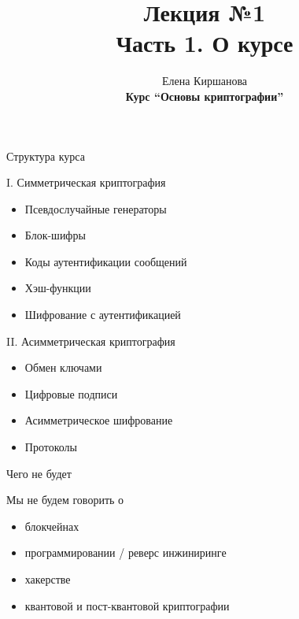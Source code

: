 \documentclass[usenames,dvipsnames,8pt,aspectratio=169]{beamer}
\title{Лекция №1 \\[10pt]
		Часть 1. О курсе}
\date{ Елена Киршанова \\  \textbf{Курс ``Основы криптографии''} \\  }
\begin{document}
	
\begin{frame}
	\titlepage
\end{frame}

\begin{frame}{Структура курса}

\Large
{\color{Orange} I. Симметрическая криптография} \\[10pt]
\begin{itemize}
	\item Псевдослучайные генераторы
	\item Блок-шифры
	\item Коды аутентификации сообщений 
	\item Хэш-функции
	\item Шифрование  с аутентификацией
\end{itemize}

\vspace{20pt}
{\color{Orange} II. Асимметрическая криптография}

\begin{itemize}
	\item Обмен ключами
	\item Цифровые подписи
	\item Асимметрическое шифрование
	\item Протоколы
\end{itemize}

\end{frame}

\begin{frame}{Чего не будет}

\Large

Мы {\color{Orange} не} будем говорить о

\begin{itemize}
	\itemsep 8pt
	\item блокчейнах
	\item программировании / реверс инжиниринге
	\item хакерстве
	\item квантовой и пост-квантовой криптографии
\end{itemize}

\end{frame}
\end{document}
